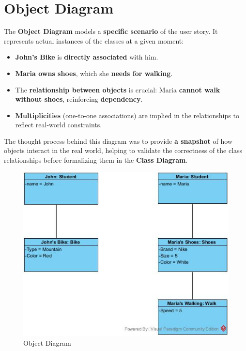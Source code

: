 \section{Object Diagram}
The \textbf{Object Diagram} models a \textbf{specific scenario} of the user story. It represents actual instances of the classes at a given moment:
\begin{itemize}
    \item \textbf{John's Bike} is \textbf{directly associated} with him.
    \item \textbf{Maria owns shoes}, which she \textbf{needs for walking}.
    \item The \textbf{relationship between objects} is crucial: Maria \textbf{cannot walk without shoes}, reinforcing \textbf{dependency}.
    \item \textbf{Multiplicities} (one-to-one associations) are implied in the relationships to reflect real-world constraints.
\end{itemize}

The thought process behind this diagram was to provide \textbf{a snapshot} of how objects interact in the real world, helping to validate the correctness of the class relationships before formalizing them in the \textbf{Class Diagram}.

\begin{figure}[h]
    \centering
    \includegraphics[scale=0.75]{Book-SSW565/jpg/ArchitectureModeling/Object Diagram1.jpg}
    \caption{\label{Figure::Object Diagram}Object Diagram}
\end{figure}

